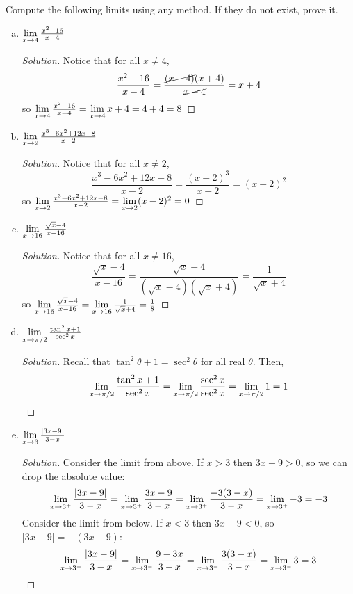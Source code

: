 \documentclass{agony}
\begin{document}
\question Compute the following limits using any method.
If they do not exist, prove it.
\begin{enumerate}[(a)]
  \item $\lim\limits_{x\to4} \frac{x^2-16}{x-4}$
        \begin{proof}[Solution]
          Notice that for all $x \neq 4$,
          \[ \frac{x^2-16}{x-4} = \frac{\cancel{(x-4)}(x+4)}{\cancel{x-4}}=x+4 \]
          so $\lim\limits_{x\to4} \frac{x^2-16}{x-4} = \lim\limits_{x\to4} x+4 = 4+4 = 8$
        \end{proof}
  \item $\lim\limits_{x\to2} \frac{x^3-6x^2+12x-8}{x-2}$
        \begin{proof}[Solution]
          Notice that for all $x \neq 2$,
          \[ \frac{x^3-6x^2+12x-8}{x-2} = \frac{(x-2)^3}{x-2} = (x-2)^2 \]
          so $\lim\limits_{x\to2} \frac{x^3-6x^2+12x-8}{x-2} = \lim\limits_{x\to2} (x-2)^2 = 0$
        \end{proof}
  \item $\lim\limits_{x\to16} \frac{\sqrt{x}-4}{x-16}$
        \begin{proof}[Solution]
          Notice that for all $x \neq 16$,
          \begin{equation*}
            \frac{\sqrt{x}-4}{x-16}
            = \frac{\sqrt{x}-4}{(\sqrt{x}-4)(\sqrt{x}+4)}
            = \frac{1}{\sqrt{x}+4}
          \end{equation*}
          so $\lim\limits_{x\to16} \frac{\sqrt{x}-4}{x-16} = \lim\limits_{x\to16} \frac{1}{\sqrt{x}+4} = \frac{1}{8}$
        \end{proof}
  \item $\lim\limits_{x\to\pi/2} \frac{\tan^2 x+1}{\sec^2 x}$
        \begin{proof}[Solution]
          Recall that $\tan^2 \theta + 1 = \sec^2 \theta$ for all real $\theta$. Then,
          \begin{equation*}
            \lim\limits_{x\to\pi/2} \frac{\tan^2 x+1}{\sec^2 x}
            = \lim\limits_{x\to\pi/2} \frac{\sec^2 x}{\sec^2 x}
            = \lim\limits_{x\to\pi/2} 1
            = 1 \qedhere
          \end{equation*}
        \end{proof}
  \item $\lim\limits_{x\to3} \frac{|3x-9|}{3-x}$
        \begin{proof}[Solution]
          Consider the limit from above.
          If $x > 3$ then $3x-9 > 0$, so we can drop the absolute value:
          \begin{equation*}
            \lim\limits_{x\to3^+} \frac{|3x-9|}{3-x}
            = \lim\limits_{x\to3^+} \frac{3x-9}{3-x}
            = \lim\limits_{x\to3^+} \frac{-3(3-x)}{3-x}
            = \lim\limits_{x\to3^+} -3
            = -3
          \end{equation*}
          Consider the limit from below.
          If $x < 3$ then $3x-9 < 0$, so $|3x-9| = -(3x-9)$:
          \begin{equation*}
            \lim\limits_{x\to3^-} \frac{|3x-9|}{3-x}
            = \lim\limits_{x\to3^-} \frac{9-3x}{3-x}
            = \lim\limits_{x\to3^-} \frac{3(3-x)}{3-x}
            = \lim\limits_{x\to3^-} 3
            = 3
          \end{equation*}


\end{proof}
\end{enumerate}
\end{document}

